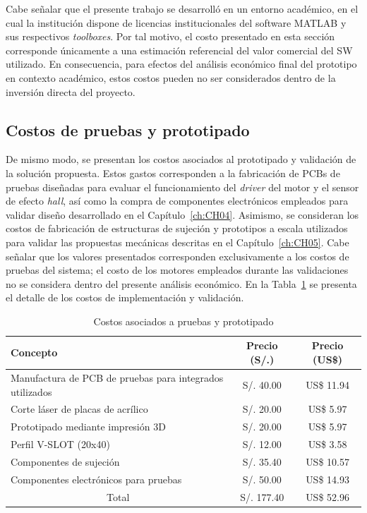 \noindent
Cabe señalar que el presente trabajo se desarrolló en un entorno académico, en el cual la institución dispone de licencias institucionales del software MATLAB y sus respectivos \textit{toolboxes}. Por tal motivo, el costo presentado en esta sección corresponde únicamente a una estimación referencial del valor comercial del \ac{SW} utilizado. En consecuencia, para efectos del análisis económico final del prototipo en contexto académico, estos costos pueden no ser considerados dentro de la inversión directa del proyecto.

\subsection{Costos de pruebas y prototipado}

\noindent
De mismo modo, se presentan los costos asociados al prototipado y validación de la solución propuesta. Estos gastos corresponden a la fabricación de \ac{PCB}s de pruebas diseñadas para evaluar el funcionamiento del \textit{driver} del motor y el sensor de efecto \textit{hall}, así como la compra de componentes electrónicos empleados para validar diseño desarrollado en el Capítulo~\ref{ch:CH04}. 
\noindent
Asimismo, se consideran los costos de fabricación de estructuras de sujeción y prototipos a escala utilizados para validar las propuestas mecánicas descritas en el Capítulo~\ref{ch:CH05}. Cabe señalar que los valores presentados corresponden exclusivamente a los costos de pruebas del sistema; el costo de los motores empleados durante las validaciones no se considera dentro del presente análisis económico. En la Tabla~\ref{tab:costos_pruebas} se presenta el detalle de los costos de implementación y validación.

\vspace{0.5em}

\begin{table}[H]
\centering
\caption{Costos asociados a pruebas y prototipado}
\label{tab:costos_pruebas}

\vspace{0.5em}

\begin{tabular}{|p{7cm}||c|c|}
\hline
Concepto & Precio (S/.) & Precio (US\$) \\
\hline
Manufactura de PCB de pruebas para integrados utilizados 
& S/. 40.00 
& US\$ 11.94 \\
\hline
Corte láser de placas de acrílico 
& S/. 20.00 
& US\$ 5.97 \\
\hline
Prototipado mediante impresión 3D 
& S/. 20.00 
& US\$ 5.97 \\
\hline
Perfil V-SLOT (20x40) 
& S/. 12.00 
& US\$ 3.58 \\
\hline
Componentes de sujeción 
& S/. 35.40 
& US\$ 10.57 \\
\hline
Componentes electrónicos para pruebas 
& S/. 50.00 
& US\$ 14.93 \\
\hline
\multicolumn{1}{|c||}{Total} 
& S/. 177.40 
& US\$ 52.96 \\
\hline
\end{tabular}
\end{table}

